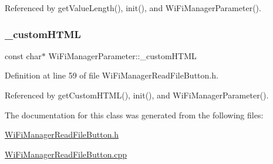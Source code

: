 Referenced by get\+Value\+Length(), init(), and Wi\+Fi\+Manager\+Parameter().

\mbox{\label{class_wi_fi_manager_parameter_a3823cb117da1a75860cc3e81b0c6f80d}} 
\subsubsection{\texorpdfstring{\+\_\+custom\+H\+T\+ML}{\_customHTML}}
{\footnotesize\ttfamily const char$\ast$ Wi\+Fi\+Manager\+Parameter\+::\+\_\+custom\+H\+T\+ML\hspace{0.3cm}{\ttfamily [private]}}



Definition at line 59 of file Wi\+Fi\+Manager\+Read\+File\+Button.\+h.



Referenced by get\+Custom\+H\+T\+M\+L(), init(), and Wi\+Fi\+Manager\+Parameter().



The documentation for this class was generated from the following files\+:\begin{DoxyCompactItemize}
\item 
\hyperlink{_wi_fi_manager_read_file_button_8h}{Wi\+Fi\+Manager\+Read\+File\+Button.\+h}\item 
\hyperlink{_wi_fi_manager_read_file_button_8cpp}{Wi\+Fi\+Manager\+Read\+File\+Button.\+cpp}\end{DoxyCompactItemize}
